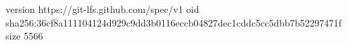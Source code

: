 version https://git-lfs.github.com/spec/v1
oid sha256:36cf8a111104124d929c9dd3b0116eccb04827dec1cddc5cc5dbb7b52297471f
size 5566
